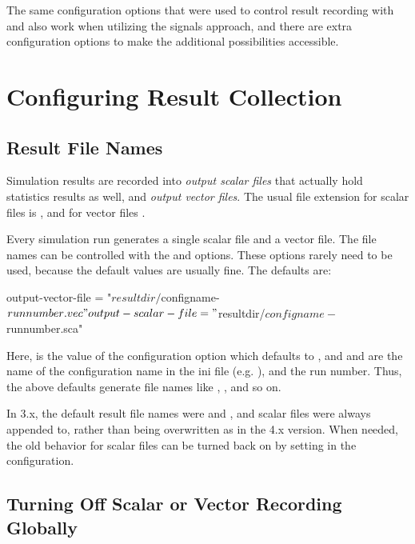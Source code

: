 The same configuration options that were used to control result recording
with  and  also work when utilizing
the signals approach, and there are extra configuration options to make
the additional possibilities accessible.


\section{Configuring Result Collection}

\subsection{Result File Names}

Simulation results are recorded into \textit{output scalar files} that
actually hold statistics results as well, and \textit{output vector
files}. The usual file extension for scalar files is , and
for vector files .

Every simulation run generates a single scalar file and a vector file.
The file names can be controlled with the 
and  options. These options rarely need
to be used, because the default values are usually fine. The defaults
are:

\begin{inifile}
output-vector-file = "${resultdir}/${configname}-${runnumber}.vec"
output-scalar-file = "${resultdir}/${configname}-${runnumber}.sca"
\end{inifile}

Here,  is the value of the 
configuration option which defaults to , and
 and  are the name of
the configuration name in the ini file (e.g. ),
and the run number. Thus, the above defaults generate file names
like , ,
and so on.

\begin{note}
  In {\opp} 3.x, the default result file names were  and
  , and scalar files were always appended to, rather than
  being overwritten as in the 4.x version. When needed, the old behavior
  for scalar files can be turned back on by setting
   in the configuration.
\end{note}

\subsection{Turning Off Scalar or Vector Recording Globally}

